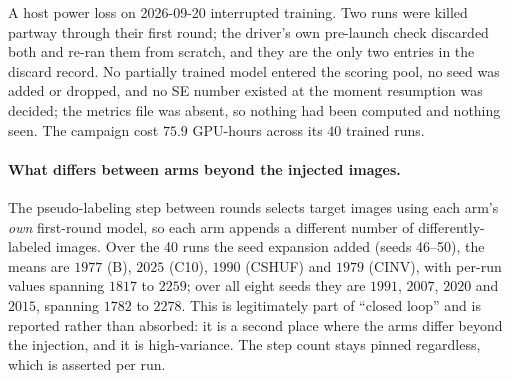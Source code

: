 \documentclass{article}
\newif\ifrevmarked \revmarkedtrue
\DeclareRobustCommand{\revShared}[1]{\ifrevmarked{\color{RevShared}#1}\else{#1}\fi}
\begin{document}
A host power loss on 2026-09-20 interrupted training. Two runs were killed partway through their
first round; the driver's own pre-launch check discarded both and re-ran them from scratch, and they
are the only two entries in the discard record. No partially trained model entered the scoring pool,
no seed was added or dropped, and no SE number existed at the moment resumption was decided; the
metrics file was absent, so nothing had been computed and nothing seen. The campaign cost $75.9$
GPU-hours across its $40$ trained runs.

\paragraph{What differs between arms beyond the injected images.} The pseudo-labeling step between
rounds selects target images using each arm's \emph{own} first-round model, so each arm appends a
different number of differently-labeled images. \revShared{Over the 40 runs the seed expansion added (seeds 46--50), the means
are $1977$ (B), $2025$ (C10), $1990$ (CSHUF) and $1979$ (CINV), with per-run values spanning $1817$ to $2259$; over all
eight seeds they are $1991$, $2007$, $2020$ and $2015$, spanning $1782$ to $2278$.} This
is legitimately part of ``closed loop'' and is reported rather than absorbed: it is a second place where the arms differ beyond the injection, and it is high-variance. The step count stays pinned
regardless, which is asserted per run.
\end{document}
